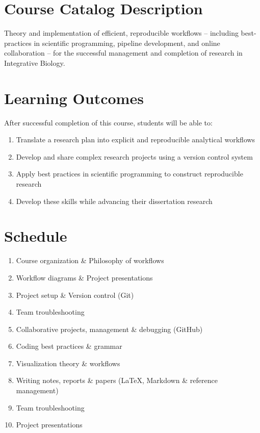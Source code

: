 \documentclass[10pt]{article}
\begin{document}
\section*{Course Catalog Description}
Theory and implementation of efficient, reproducible workflows -- including best-practices in scientific programming, pipeline development, and online collaboration --  for the successful management and completion of research in Integrative Biology.

\section*{Learning Outcomes}
After successful completion of this course, students will be able to:
\begin{enumerate}
	\item Translate a research plan into explicit and reproducible analytical workflows
	\item Develop and share complex research projects using a version control system
	\item Apply best practices in scientific programming to construct reproducible research
	\item Develop these skills while advancing their dissertation research
\end{enumerate}
	
	
\section*{Schedule}
\begin{enumerate}[label=\bfseries Week \arabic*:,leftmargin=*,labelindent=1em]
	\item  Course organization \& Philosophy of workflows
	\item Workflow diagrams \& Project presentations
	\item Project setup \& Version control (Git)
	\item Team troubleshooting
	\item Collaborative projects, management \& debugging (GitHub)
	\item Coding best practices \& grammar
	\item Visualization theory \& workflows
	\item Writing notes, reports \& papers (\LaTeX, Markdown \& reference management)
	\item Team troubleshooting
	\item Project presentations
\end{enumerate}
\end{document}
